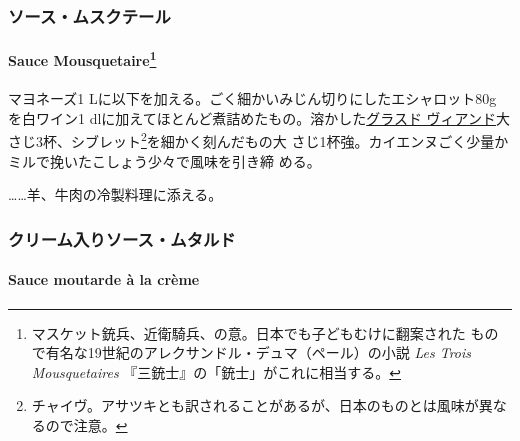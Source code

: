 \begin{recette}
\maeaki

\hypertarget{ux30bdux30fcux30b9ux30e0ux30b9ux30afux30c6ux30fcux30eb}{%
\subsubsection{ソース・ムスクテール}\label{ux30bdux30fcux30b9ux30e0ux30b9ux30afux30c6ux30fcux30eb}}

\hypertarget{sauce-mousquetaire}{%
\paragraph[Sauce Mousquetaire]{\texorpdfstring{Sauce
Mousquetaire\footnote{マスケット銃兵、近衛騎兵、の意。日本でも子どもむけに翻案された
  もので有名な19世紀のアレクサンドル・デュマ（ペール）の小説 \emph{Les
  Trois Mousquetaires} 『三銃士』の「銃士」がこれに相当する。}}{Sauce Mousquetaire}}\label{sauce-mousquetaire}}


マヨネーズ1 Lに以下を加える。ごく細かいみじん切りにしたエシャロット80g
を白ワイン1\undemi{}
dlに加えてほとんど煮詰めたもの。溶かした\protect\hyperlink{glace-de-viande}{グラスド
ヴィアンド}大さじ3杯、シブレット\footnote{チャイヴ。アサツキとも訳されることがあるが、日本のものとは風味が異なるので注意。}を細かく刻んだもの大
さじ1杯強。カイエンヌごく少量かミルで挽いたこしょう少々で風味を引き締
める。

\ldots{}\ldots{}羊、牛肉の冷製料理に添える。

\maeaki

\hypertarget{ux30afux30eaux30fcux30e0ux5165ux308aux30bdux30fcux30b9ux30e0ux30bfux30ebux30c9}{%
\subsubsection{クリーム入りソース・ムタルド}\label{ux30afux30eaux30fcux30e0ux5165ux308aux30bdux30fcux30b9ux30e0ux30bfux30ebux30c9}}

\hypertarget{sauce-moutarde-a-la-creme}{%
\paragraph{Sauce moutarde à la crème}\label{sauce-moutarde-a-la-creme}}


\end{recette}
